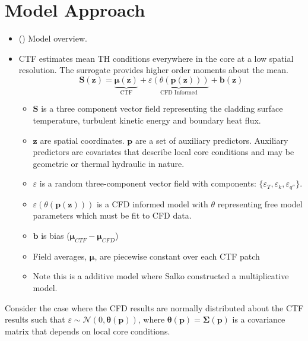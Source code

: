 
\section{Model Approach}

\begin{itemize}
        \item (\checkmark) Model overview.
    \item CTF estimates mean TH conditions everywhere in the core at a low spatial resolution.  The surrogate provides higher order moments about the mean.
    \begin{equation}
    \mathbf S(\mathbf z) = \underbrace{ \bm \mu(\mathbf{z})}_\text{CTF} +
    \underbrace{\varepsilon({\theta (\bm p(\mathbf z))})}_\text{CFD Informed} + \bm b(\mathbf{z})
    \end{equation}
    \begin{itemize}
        \item $\mathbf S$ is a three component vector field representing the cladding surface temperature, turbulent kinetic energy and boundary heat flux.
        \item $\mathbf z$ are spatial coordinates. $\mathbf p$ are a set of auxiliary predictors.  Auxiliary predictors are covariates that describe local core conditions and may be geometric or thermal hydraulic in nature.
        \item $\varepsilon$ is a random three-component vector field with components: $\{\varepsilon_T, \varepsilon_k, \varepsilon_{q''}\}$.
        \item $\varepsilon({\theta (\bm p(\mathbf z))})$ is a CFD informed model with $\theta$ representing free model parameters which must be fit to CFD data.
        \item $\bm b$ is bias ($\bm \mu_{CTF} - \bm \mu_{CFD}$)
        \item Field averages, $\bm \mu$, are piecewise constant over each CTF patch
        \item Note this is a additive model where Salko constructed a multiplicative model.
    \end{itemize}
\end{itemize}

Consider the case where the CFD results are normally distributed about the CTF results such that $\varepsilon \sim \mathcal N(0, \mathbf \theta(\mathbf p))$, where $\mathbf \theta(\mathbf p) = \bm \Sigma(\mathbf p)$ is a covariance matrix that depends on local core conditions.

